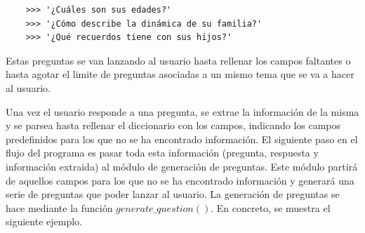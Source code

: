 \begin{verbatim}
	>>>	'¿Cuáles son sus edades?'
	>>> '¿Cómo describe la dinámica de su familia?'
	>>> '¿Qué recuerdos tiene con sus hijos?'
\end{verbatim}

Estas preguntas se van lanzando al usuario hasta rellenar los campos faltantes o hasta agotar el limite de preguntas asociadas a un mismo tema que se va a hacer al usuario.

Una vez el usuario responde a una pregunta, se extrae la información de la misma y se parsea hasta rellenar el diccionario con los campos, indicando los campos predefinidos para los que no se ha encontrado información. El siguiente paso en el flujo del programa es pasar toda esta información (pregunta, respuesta y información extraida) al módulo de generación de preguntas. Este módulo partirá de aquellos campos para los que no se ha encontrado información y generará una serie de preguntas que poder lanzar al usuario. La generación de preguntas se hace mediante la función $generate\_question()$. En concreto, se muestra el siguiente ejemplo. 


